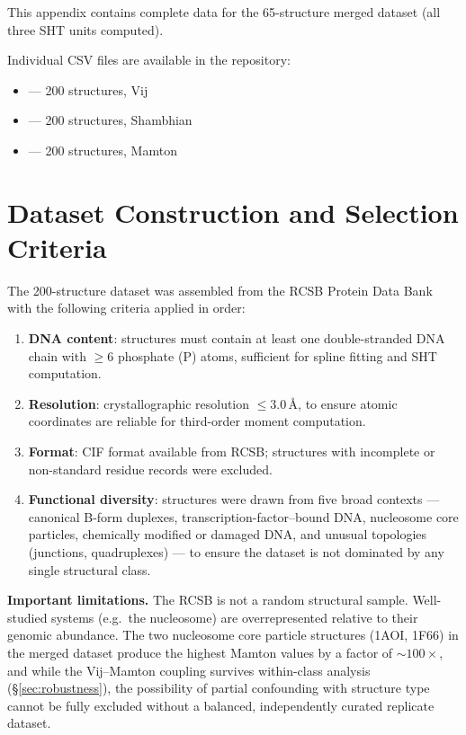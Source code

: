 

This appendix contains complete data for the 65-structure merged dataset (all three SHT units computed).

Individual CSV files are available in the repository:
\begin{itemize}
    \item {} --- 200 structures, Vij
    \item {} --- 200 structures, Shambhian
    \item {} --- 200 structures, Mamton
\end{itemize}

\section{Dataset Construction and Selection Criteria}

The 200-structure dataset was assembled from the RCSB Protein Data Bank with the following criteria applied in order:
\begin{enumerate}
    \item \textbf{DNA content}: structures must contain at least one double-stranded DNA chain with $\geq 6$ phosphate (P) atoms, sufficient for spline fitting and SHT computation.
    \item \textbf{Resolution}: crystallographic resolution $\leq 3.0$\,\AA, to ensure atomic coordinates are reliable for third-order moment computation.
    \item \textbf{Format}: CIF format available from RCSB; structures with incomplete or non-standard residue records were excluded.
    \item \textbf{Functional diversity}: structures were drawn from five broad contexts --- canonical B-form duplexes, transcription-factor--bound DNA, nucleosome core particles, chemically modified or damaged DNA, and unusual topologies (junctions, quadruplexes) --- to ensure the dataset is not dominated by any single structural class.
\end{enumerate}

\textbf{Important limitations.} The RCSB is not a random structural sample. Well-studied systems (e.g.\ the nucleosome) are overrepresented relative to their genomic abundance. The two nucleosome core particle structures (1AOI, 1F66) in the merged dataset produce the highest Mamton values by a factor of $\sim\!100\times$, and while the Vij--Mamton coupling survives within-class analysis (\S\ref{sec:robustness}), the possibility of partial confounding with structure type cannot be fully excluded without a balanced, independently curated replicate dataset.

